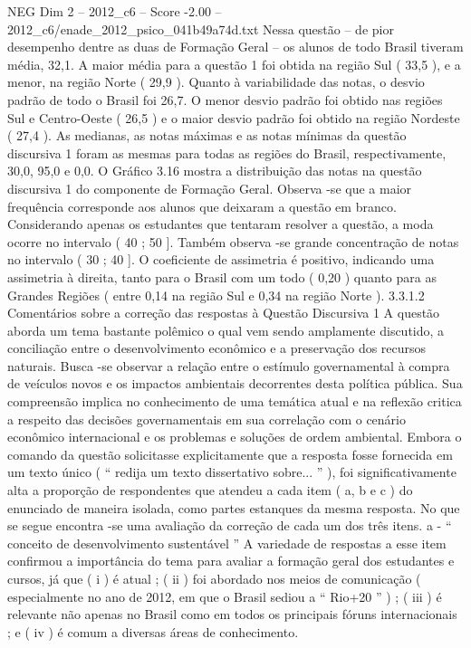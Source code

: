 \begin{textsample}{NEG Dim 2 – 2012\_c6 – Score -2.00 – 2012\_c6/enade\_2012\_psico\_041b49a74d.txt}
Nessa questão – de pior desempenho dentre as duas de Formação Geral – os alunos de todo Brasil tiveram média, 32,1.
A maior média para a questão 1 foi obtida na região Sul ( 33,5 ), e a menor, na região Norte ( 29,9 ).
Quanto à variabilidade das notas, o desvio padrão de todo o Brasil foi 26,7.
O menor desvio padrão foi obtido nas regiões Sul e Centro-Oeste ( 26,5 ) e o maior desvio padrão foi obtido na região Nordeste ( 27,4 ).
As medianas, as notas máximas e as notas mínimas da questão discursiva 1 foram as mesmas para todas as regiões do Brasil, respectivamente, 30,0, 95,0 e 0,0.
O Gráfico 3.16 mostra a distribuição das notas na questão discursiva 1 do componente de Formação Geral.
Observa -se que a maior frequência corresponde aos alunos que deixaram a questão em branco.
Considerando apenas os estudantes que tentaram resolver a questão, a moda ocorre no intervalo ( 40 ; 50 ].
Também observa -se grande concentração de notas no intervalo ( 30 ; 40 ].
O coeficiente de assimetria é positivo, indicando uma assimetria à direita, tanto para o Brasil com um todo ( 0,20 ) quanto para as Grandes Regiões ( entre 0,14 na região Sul e 0,34 na região Norte ). 3.3.1.2 Comentários sobre a correção das respostas à Questão Discursiva 1 A questão aborda um tema bastante polêmico o qual vem sendo amplamente discutido, a conciliação entre o desenvolvimento econômico e a preservação dos recursos naturais.
Busca -se observar a relação entre o estímulo governamental à compra de veículos novos e os impactos ambientais decorrentes desta política pública.
Sua compreensão implica no conhecimento de uma temática atual e na reflexão critica a respeito das decisões governamentais em sua correlação com o cenário econômico internacional e os problemas e soluções de ordem ambiental.
Embora o comando da questão solicitasse explicitamente que a resposta fosse fornecida em um texto único ( “ redija um texto dissertativo sobre... ” ), foi significativamente alta a proporção de respondentes que atendeu a cada item ( a, b e c ) do enunciado de maneira isolada, como partes estanques da mesma resposta.
No que se segue encontra -se uma avaliação da correção de cada um dos três itens. a - “ conceito de desenvolvimento sustentável ” A variedade de respostas a esse item confirmou a importância do tema para avaliar a formação geral dos estudantes e cursos, já que ( i ) é atual ; ( ii ) foi abordado nos meios de comunicação ( especialmente no ano de 2012, em que o Brasil sediou a “ Rio+20 ” ) ; ( iii ) é relevante não apenas no Brasil como em todos os principais fóruns internacionais ; e ( iv ) é comum a diversas áreas de conhecimento.

\end{textsample}

